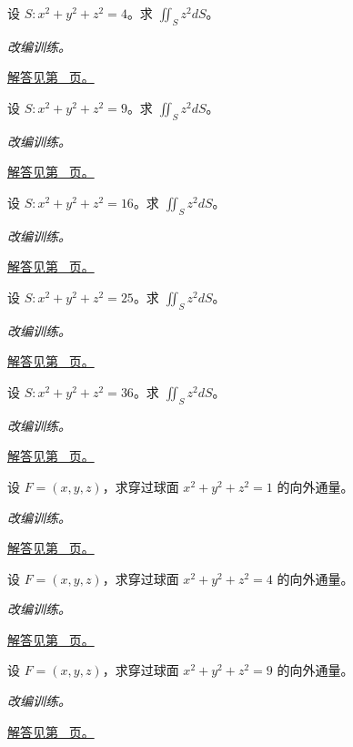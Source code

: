 \documentclass[UTF8,12pt,a4paper,fontset=fandol]{ctexart}
\begin{document}
\begin{example}[球面的二次函数积分]\label{ex:c43q8}
设 $S:x^2+y^2+z^2=4$。求 $\displaystyle\iint_Sz^2dS$。
\par\textit{改编训练。}\par\hyperref[ans:c43q8]{解答见第~\pageref{ans:c43q8} 页。}
\end{example}
\begin{example}[球面的二次函数积分]\label{ex:c43q9}
设 $S:x^2+y^2+z^2=9$。求 $\displaystyle\iint_Sz^2dS$。
\par\textit{改编训练。}\par\hyperref[ans:c43q9]{解答见第~\pageref{ans:c43q9} 页。}
\end{example}
\begin{example}[球面的二次函数积分]\label{ex:c43q10}
设 $S:x^2+y^2+z^2=16$。求 $\displaystyle\iint_Sz^2dS$。
\par\textit{改编训练。}\par\hyperref[ans:c43q10]{解答见第~\pageref{ans:c43q10} 页。}
\end{example}
\begin{example}[球面的二次函数积分]\label{ex:c43q11}
设 $S:x^2+y^2+z^2=25$。求 $\displaystyle\iint_Sz^2dS$。
\par\textit{改编训练。}\par\hyperref[ans:c43q11]{解答见第~\pageref{ans:c43q11} 页。}
\end{example}
\begin{example}[球面的二次函数积分]\label{ex:c43q12}
设 $S:x^2+y^2+z^2=36$。求 $\displaystyle\iint_Sz^2dS$。
\par\textit{改编训练。}\par\hyperref[ans:c43q12]{解答见第~\pageref{ans:c43q12} 页。}
\end{example}
\begin{example}[散度定理计算球面通量]\label{ex:c43q13}
设 $F=(x,y,z)$，求穿过球面 $x^2+y^2+z^2=1$ 的向外通量。
\par\textit{改编训练。}\par\hyperref[ans:c43q13]{解答见第~\pageref{ans:c43q13} 页。}
\end{example}
\begin{example}[散度定理计算球面通量]\label{ex:c43q14}
设 $F=(x,y,z)$，求穿过球面 $x^2+y^2+z^2=4$ 的向外通量。
\par\textit{改编训练。}\par\hyperref[ans:c43q14]{解答见第~\pageref{ans:c43q14} 页。}
\end{example}
\begin{example}[散度定理计算球面通量]\label{ex:c43q15}
设 $F=(x,y,z)$，求穿过球面 $x^2+y^2+z^2=9$ 的向外通量。
\par\textit{改编训练。}\par\hyperref[ans:c43q15]{解答见第~\pageref{ans:c43q15} 页。}
\end{example}
\end{document}

